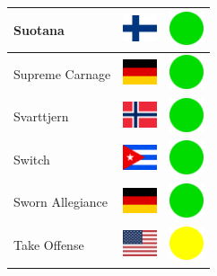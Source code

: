 \documentclass[12pt, a4paper, twoside]{report}
\begin{document}
\begin{center}
\begin{longtable}{|p{5cm}|p{2cm}|p{2cm}|}
 Suotana                                                    & \includegraphics[width=1cm]{../img/flags/fi} &   \includegraphics[width=1cm]{../likes/y} \\ \hline
 Supreme Carnage                                            & \includegraphics[width=1cm]{../img/flags/de} &   \includegraphics[width=1cm]{../likes/y} \\ \hline
 Svarttjern                                                 & \includegraphics[width=1cm]{../img/flags/no} &   \includegraphics[width=1cm]{../likes/y} \\ \hline
 Switch                                                     & \includegraphics[width=1cm]{../img/flags/cu} &   \includegraphics[width=1cm]{../likes/y} \\ \hline
 Sworn Allegiance                                           & \includegraphics[width=1cm]{../img/flags/de} &   \includegraphics[width=1cm]{../likes/y} \\ \hline
 Take Offense                                               & \includegraphics[width=1cm]{../img/flags/us} &   \includegraphics[width=1cm]{../likes/m} \\ \hline

\end{longtable}
\end{center}
\end{document}
